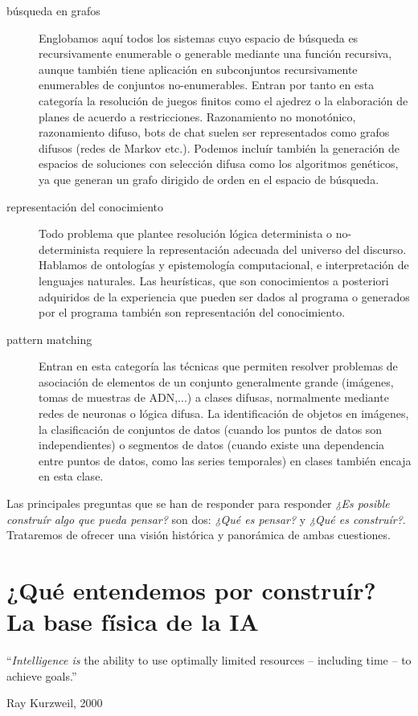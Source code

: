 \documentclass[12pt]{memoir}
\begin{document}
\begin{description}
	\item[búsqueda en grafos] Englobamos aquí todos los sistemas cuyo espacio de búsqueda es recursivamente enumerable o generable mediante una función recursiva, aunque también tiene aplicación en subconjuntos recursivamente enumerables de conjuntos no-enumerables. Entran por tanto en esta categoría la resolución de juegos finitos como el ajedrez o la elaboración de planes de acuerdo a restricciones. Razonamiento no monotónico, razonamiento difuso, bots de chat suelen ser representados como grafos difusos (redes de Markov etc.). Podemos incluír también la generación de espacios de soluciones con selección difusa como los algoritmos genéticos, ya que generan un grafo dirigido de orden en el espacio de búsqueda.
\end{description}
\begin{description}
	\item[representación del conocimiento] Todo problema que plantee resolución lógica determinista o no-determinista requiere la representación adecuada del universo del discurso. Hablamos de ontologías y epistemología computacional, e interpretación de lenguajes naturales. Las heurísticas, que son conocimientos a posteriori adquiridos de la experiencia que pueden ser dados al programa o generados por el programa también son representación del conocimiento.
\end{description}
\begin{description}
	\item[pattern matching] Entran en esta categoría las técnicas que permiten resolver problemas de asociación de elementos de un conjunto generalmente grande (imágenes, tomas de muestras de ADN,...) a clases difusas, normalmente mediante redes de neuronas o lógica difusa. La identificación de objetos en imágenes, la clasificación de conjuntos de datos (cuando los puntos de datos son independientes) o segmentos de datos (cuando existe una dependencia entre puntos de datos, como las series temporales) en clases también encaja en esta clase.
\end{description}

Las principales preguntas que se han de responder para responder \textit{¿Es posible construír algo que pueda pensar?} son dos: \textit{¿Qué es pensar?} y \textit{¿Qué es construír?}. Trataremos de ofrecer una visión histórica y panorámica de ambas cuestiones.

\chapter{¿Qué entendemos por construír?\\La base física de la IA}
\epigraph{``\textit{Intelligence is} the ability to use optimally limited resources – including time – to achieve goals.''}{Ray Kurzweil, 2000}
 
\end{document}
